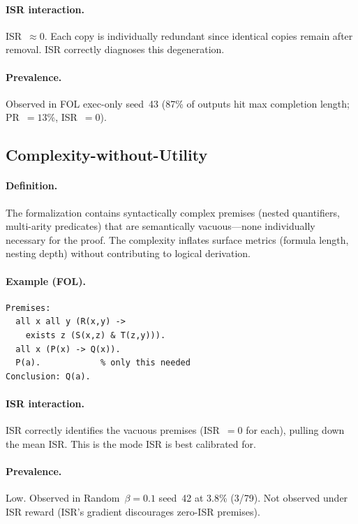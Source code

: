 \paragraph{ISR interaction.}
ISR~$\approx 0$. Each copy is individually redundant since identical copies remain after removal.
ISR correctly diagnoses this degeneration.

\paragraph{Prevalence.}
Observed in FOL exec-only seed~43 (87\% of outputs hit max completion length; PR~$=13$\%, ISR~$=0$).


\subsection{Complexity-without-Utility}

\paragraph{Definition.}
The formalization contains syntactically complex premises (nested quantifiers, multi-arity predicates) that are semantically vacuous---none individually necessary for the proof.
The complexity inflates surface metrics (formula length, nesting depth) without contributing to logical derivation.

\paragraph{Example (FOL).}
{\small\begin{verbatim}
Premises:
  all x all y (R(x,y) ->
    exists z (S(x,z) & T(z,y))).
  all x (P(x) -> Q(x)).
  P(a).            % only this needed
Conclusion: Q(a).
\end{verbatim}}

\paragraph{ISR interaction.}
ISR correctly identifies the vacuous premises (ISR~$=0$ for each), pulling down the mean ISR.
This is the mode ISR is best calibrated for.

\paragraph{Prevalence.}
Low. Observed in Random~$\beta{=}0.1$ seed~42 at 3.8\% (3/79).
Not observed under ISR reward (ISR's gradient discourages zero-ISR premises).


